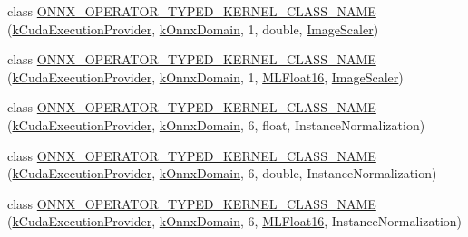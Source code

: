 \begin{DoxyCompactItemize}
\item 
class \mbox{\hyperlink{namespaceonnxruntime_1_1cuda_af3a6023cf80c4fc294005e7c0759e05a}{O\+N\+N\+X\+\_\+\+O\+P\+E\+R\+A\+T\+O\+R\+\_\+\+T\+Y\+P\+E\+D\+\_\+\+K\+E\+R\+N\+E\+L\+\_\+\+C\+L\+A\+S\+S\+\_\+\+N\+A\+ME}} (\mbox{\hyperlink{namespaceonnxruntime_a73ebc64887ddd1968e3cef47ffefe35b}{k\+Cuda\+Execution\+Provider}}, \mbox{\hyperlink{namespaceonnxruntime_ac0e7c0c106a2c9e9594560a3ab289fa0}{k\+Onnx\+Domain}}, 1, double, \mbox{\hyperlink{classonnxruntime_1_1cuda_1_1ImageScaler}{Image\+Scaler}})
\item 
class \mbox{\hyperlink{namespaceonnxruntime_1_1cuda_a30b47e7a45b6a60ad0e295eae3632f65}{O\+N\+N\+X\+\_\+\+O\+P\+E\+R\+A\+T\+O\+R\+\_\+\+T\+Y\+P\+E\+D\+\_\+\+K\+E\+R\+N\+E\+L\+\_\+\+C\+L\+A\+S\+S\+\_\+\+N\+A\+ME}} (\mbox{\hyperlink{namespaceonnxruntime_a73ebc64887ddd1968e3cef47ffefe35b}{k\+Cuda\+Execution\+Provider}}, \mbox{\hyperlink{namespaceonnxruntime_ac0e7c0c106a2c9e9594560a3ab289fa0}{k\+Onnx\+Domain}}, 1, \mbox{\hyperlink{uniononnxruntime_1_1MLFloat16}{M\+L\+Float16}}, \mbox{\hyperlink{classonnxruntime_1_1cuda_1_1ImageScaler}{Image\+Scaler}})
\item 
class \mbox{\hyperlink{namespaceonnxruntime_1_1cuda_a9abdb9e8721e6a4b8d1ee95a26561b3d}{O\+N\+N\+X\+\_\+\+O\+P\+E\+R\+A\+T\+O\+R\+\_\+\+T\+Y\+P\+E\+D\+\_\+\+K\+E\+R\+N\+E\+L\+\_\+\+C\+L\+A\+S\+S\+\_\+\+N\+A\+ME}} (\mbox{\hyperlink{namespaceonnxruntime_a73ebc64887ddd1968e3cef47ffefe35b}{k\+Cuda\+Execution\+Provider}}, \mbox{\hyperlink{namespaceonnxruntime_ac0e7c0c106a2c9e9594560a3ab289fa0}{k\+Onnx\+Domain}}, 6, float, Instance\+Normalization)
\item 
class \mbox{\hyperlink{namespaceonnxruntime_1_1cuda_a20db7996c8144e74f67378c3b8cc596b}{O\+N\+N\+X\+\_\+\+O\+P\+E\+R\+A\+T\+O\+R\+\_\+\+T\+Y\+P\+E\+D\+\_\+\+K\+E\+R\+N\+E\+L\+\_\+\+C\+L\+A\+S\+S\+\_\+\+N\+A\+ME}} (\mbox{\hyperlink{namespaceonnxruntime_a73ebc64887ddd1968e3cef47ffefe35b}{k\+Cuda\+Execution\+Provider}}, \mbox{\hyperlink{namespaceonnxruntime_ac0e7c0c106a2c9e9594560a3ab289fa0}{k\+Onnx\+Domain}}, 6, double, Instance\+Normalization)
\item 
class \mbox{\hyperlink{namespaceonnxruntime_1_1cuda_ad7f21be0a54f704f35dc6401b6723b3a}{O\+N\+N\+X\+\_\+\+O\+P\+E\+R\+A\+T\+O\+R\+\_\+\+T\+Y\+P\+E\+D\+\_\+\+K\+E\+R\+N\+E\+L\+\_\+\+C\+L\+A\+S\+S\+\_\+\+N\+A\+ME}} (\mbox{\hyperlink{namespaceonnxruntime_a73ebc64887ddd1968e3cef47ffefe35b}{k\+Cuda\+Execution\+Provider}}, \mbox{\hyperlink{namespaceonnxruntime_ac0e7c0c106a2c9e9594560a3ab289fa0}{k\+Onnx\+Domain}}, 6, \mbox{\hyperlink{uniononnxruntime_1_1MLFloat16}{M\+L\+Float16}}, Instance\+Normalization)

\end{DoxyCompactItemize}
